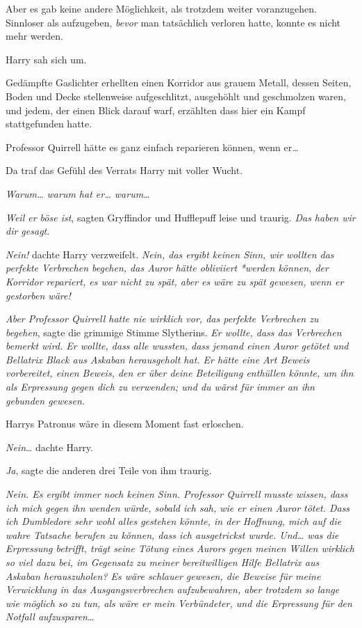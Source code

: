 {Aber es gab keine andere Möglichkeit, als trotzdem weiter voranzugehen. Sinnloser als aufzugeben, \emph{bevor} man tatsächlich verloren hatte, konnte es nicht mehr werden.

Harry sah sich um.

Gedämpfte Gaslichter erhellten einen Korridor aus grauem Metall, dessen Seiten, Boden und Decke stellenweise aufgeschlitzt, ausgehöhlt und geschmolzen waren, und jedem, der einen Blick darauf warf, erzählten dass hier ein Kampf stattgefunden hatte.

Professor Quirrell hätte es ganz einfach reparieren können, wenn er…

Da traf das Gefühl des Verrats Harry mit voller Wucht.

\emph{Warum… warum hat er… warum…}

\emph{Weil er böse ist}, sagten Gryffindor und Hufflepuff leise und traurig. \emph{Das haben wir dir gesagt}.

\emph{Nein!} dachte Harry verzweifelt. \emph{Nein, das ergibt keinen Sinn, wir wollten das perfekte Verbrechen begehen, das Auror hätte obliviiert} \emph{*werden können, der Korridor repariert, es war nicht zu spät, aber es wäre zu spät gewesen, wenn er gestorben wäre!}

\emph{Aber Professor Quirrell hatte nie wirklich vor, das perfekte Verbrechen zu begehen}, sagte die grimmige Stimme Slytherins. \emph{Er wollte, dass das Verbrechen bemerkt wird. Er wollte, dass alle wussten, dass jemand einen Auror getötet und Bellatrix Black aus Askaban herausgeholt hat. Er hätte eine Art Beweis vorbereitet, einen Beweis, den er über deine Beteiligung enthüllen könnte, um ihn als Erpressung gegen dich zu verwenden; und du wärst für immer an ihn gebunden gewesen.}

Harrys Patronus wäre in diesem Moment fast erloschen.

\emph{Nein}… dachte Harry.

\emph{Ja}, sagte die anderen drei Teile von ihm traurig.

\emph{Nein. Es ergibt immer noch keinen Sinn. Professor Quirrell musste wissen, dass ich mich gegen ihn wenden würde, sobald ich sah, wie er einen Auror tötet. Dass ich Dumbledore sehr wohl alles gestehen könnte, in der Hoffnung, mich auf die wahre Tatsache berufen zu können, dass ich ausgetrickst wurde. Und… was die Erpressung betrifft, trägt seine Tötung eines Aurors gegen meinen Willen wirklich so viel dazu bei, im Gegensatz zu meiner bereitwilligen Hilfe Bellatrix aus Askaban herauszuholen? Es wäre schlauer gewesen, die Beweise für meine Verwicklung in das Ausgangsverbrechen aufzubewahren, aber trotzdem so lange wie möglich so zu tun, als wäre er mein Verbündeter, und die Erpressung für den Notfall aufzusparen}…

}
